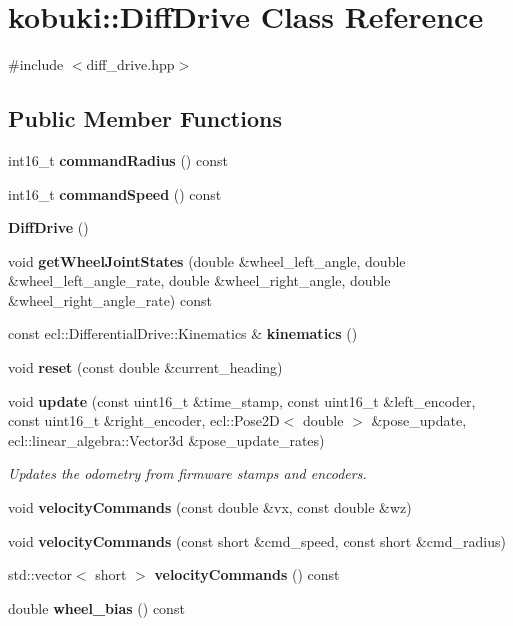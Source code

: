 \section{kobuki\-:\-:\-Diff\-Drive \-Class \-Reference}
\label{classkobuki_1_1DiffDrive}


{\ttfamily \#include $<$diff\-\_\-drive.\-hpp$>$}

\subsection*{\-Public \-Member \-Functions}
\begin{DoxyCompactItemize}
\item 
int16\-\_\-t {\bf command\-Radius} () const 
\item 
int16\-\_\-t {\bf command\-Speed} () const 
\item 
{\bf \-Diff\-Drive} ()
\item 
void {\bf get\-Wheel\-Joint\-States} (double \&wheel\-\_\-left\-\_\-angle, double \&wheel\-\_\-left\-\_\-angle\-\_\-rate, double \&wheel\-\_\-right\-\_\-angle, double \&wheel\-\_\-right\-\_\-angle\-\_\-rate) const 
\item 
const \*
ecl\-::\-Differential\-Drive\-::\-Kinematics \& {\bf kinematics} ()
\item 
void {\bf reset} (const double \&current\-\_\-heading)
\item 
void {\bf update} (const uint16\-\_\-t \&time\-\_\-stamp, const uint16\-\_\-t \&left\-\_\-encoder, const uint16\-\_\-t \&right\-\_\-encoder, ecl\-::\-Pose2\-D$<$ double $>$ \&pose\-\_\-update, ecl\-::linear\-\_\-algebra\-::\-Vector3d \&pose\-\_\-update\-\_\-rates)
\begin{DoxyCompactList}\small\item\em \-Updates the odometry from firmware stamps and encoders. \end{DoxyCompactList}\item 
void {\bf velocity\-Commands} (const double \&vx, const double \&wz)
\item 
void {\bf velocity\-Commands} (const short \&cmd\-\_\-speed, const short \&cmd\-\_\-radius)
\item 
std\-::vector$<$ short $>$ {\bf velocity\-Commands} () const 
\item 
double {\bf wheel\-\_\-bias} () const 
\end{DoxyCompactItemize}
